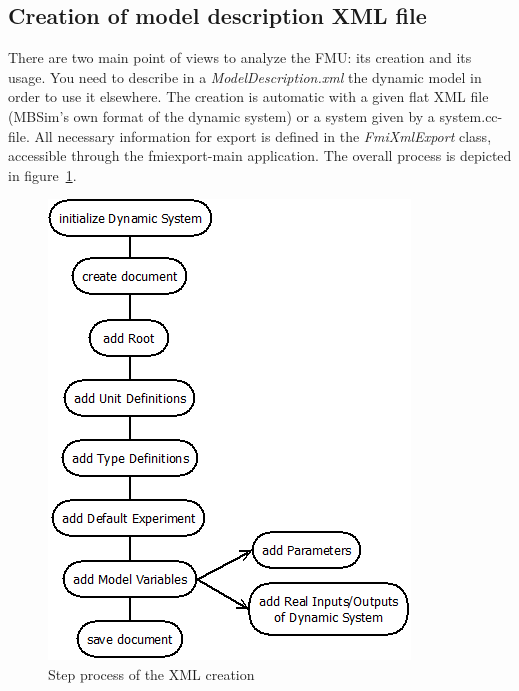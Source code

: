 \documentclass[10pt,a4paper]{report}
\begin{document}
\subsection*{Creation of model description XML file}
There are two main point of views to analyze the FMU: its creation and its usage. You need to describe in a \emph{ModelDescription.xml} the dynamic model in order to use it elsewhere. The creation is automatic with a given flat XML file (MBSim's own format of the dynamic system) or a system given by a system.cc-file. All necessary information for export is defined in the \emph{FmiXmlExport} class, accessible through the fmiexport-main application. The overall process is depicted in figure~\ref{fig:fmiexport}.
%
\begin{figure}[!h]
	\centering
	\includegraphics[scale=0.6]{fmiexport}
	\caption{Step process of the XML creation}
	\label{fig:fmiexport}
\end{figure}
%
\end{document}
